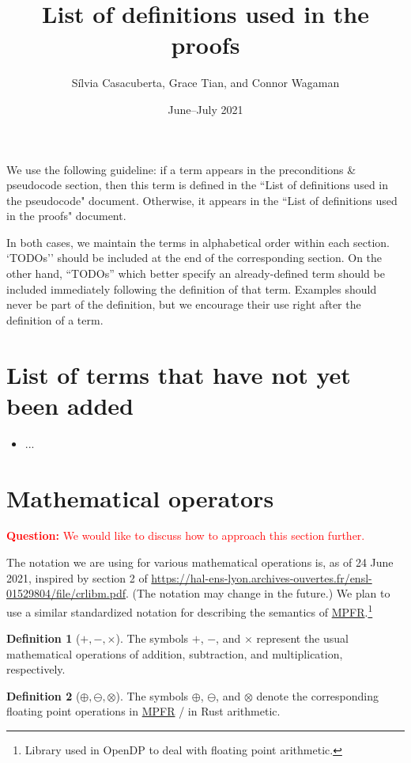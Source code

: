 \documentclass[11pt,a4paper]{article}
\title{List of definitions used in the proofs}
\author{S\'ilvia Casacuberta, Grace Tian, and Connor Wagaman}
\date{June--July 2021}
\theoremstyle{definition}
\newtheorem{definition}{Definition}[section]
\newcommand{\questionc}[1]{\textcolor{red}{\textbf{Question:} #1}}
\begin{document}
\maketitle

We use the following guideline: if a term appears in the preconditions \& pseudocode section, then this term is defined in the ``List of definitions used in the pseudocode" document. Otherwise, it appears in the ``List of definitions used in the proofs" document. 

In both cases, we maintain the terms in alphabetical order within each section. `TODOs'' should be included at the end of the corresponding section. On the other hand, ``TODOs'' which better specify an already-defined term should be included immediately following the definition of that term. Examples should never be part of the definition, but we encourage their use right after the definition of a term.

\tableofcontents

\section*{List of terms that have not yet been added}
\begin{itemize}
\item ...
\end{itemize}

\section{Mathematical operators}
\questionc{We would like to discuss how to approach this section further.}

The notation we are using for various mathematical operations is, as of 24 June 2021, inspired by section 2 of \url{https://hal-ens-lyon.archives-ouvertes.fr/ensl-01529804/file/crlibm.pdf}. (The notation may change in the future.) We plan to use a similar standardized notation for describing the semantics of \href{https://www.mpfr.org/}{MPFR}.\footnote{Library used in OpenDP to deal with floating point arithmetic.}

\begin{definition}[$+, -, \times$]
    The symbols $+$, $-$, and $\times$ represent the usual mathematical operations of addition, subtraction, and multiplication, respectively.
\end{definition}

\begin{definition}[$\oplus, \ominus, \otimes$]
    The symbols $\oplus$, $\ominus$, and $\otimes$ denote the corresponding floating point operations in \href{https://www.mpfr.org/}{MPFR} / in Rust arithmetic. 
\end{definition}
\end{document}
